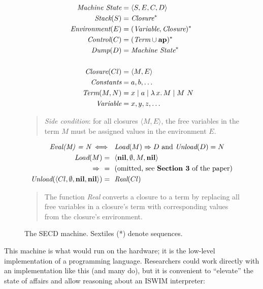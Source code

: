 \documentclass{article}
\begin{document}
\begin{figure}[ht]
  \begin{align*}
    \emph{Machine State}   &= \langle S, E, C, D \rangle
  \\\emph{Stack} (S)       &= \emph{Closure}^*
  \\\emph{Environment} (E) &= (\emph{Variable}, \emph{Closure})^*
  \\\emph{Control} (C)     &= (\emph{Term} \cup {\bf ap})^*
  \\\emph{Dump} (D)        &= \emph{Machine State}^*
  \\
  \\\emph{Closure} (Cl)    &= \langle M, E \rangle 
  \\\emph{Constants}       &= a,b,\ldots
  \\\emph{Term} (M,N)      &= x \mid a \mid \lambda\,x.\,M \mid M~N
  \\\emph{Variable}        &= x,y,z,\ldots
  \end{align*}

  \begin{quote}
    \emph{Side condition}: for all closures $\langle M, E \rangle$, the free variables in the term $M$ must be assigned values in the environment $E$.
  \end{quote}
  
  \begin{align*}
    \emph{Eval(M) = N} \iff& ~~\emph{Load}(M) \Rightarrow D \mbox{ and } \emph{Unload}(D) = N
  \\\emph{Load}(M) =&~~\langle {\bf nil}, \emptyset, M, {\bf nil} \rangle
  \\\Rightarrow~~  =&~~\mbox{(omitted, see {\bf Section 3} of the paper)}
  \\\emph{Unload}(\langle Cl, \emptyset, {\bf nil}, {\bf nil}\rangle) =&~~\emph{Real}(Cl)
  \end{align*}

  \begin{quote}
    The function \emph{Real} converts a closure to a term by replacing all free variables in a closure's term with corresponding values from the closure's environment.
  \end{quote}
\label{fig:secd}
\caption{The SECD machine. Sextiles (*) denote sequences.}
\end{figure}

This machine is what would run on the hardware; it is the low-level implementation of a programming language.
Researchers could work directly with an implementation like this (and many do), but it is convenient to ``elevate'' the state of affairs and allow reasoning about an ISWIM interpreter:
\end{document}
